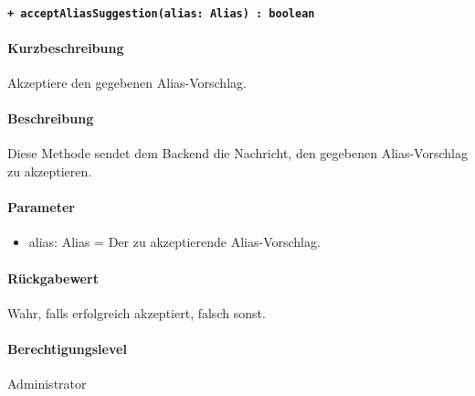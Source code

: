 \paragraph{\texttt{+ acceptAliasSuggestion(alias: Alias) : boolean}}\label{AP_Framework_acceptAliasSuggestion}%
\paragraph*{Kurzbeschreibung}
Akzeptiere den gegebenen Alias-Vorschlag.
\paragraph*{Beschreibung}
Diese Methode sendet dem Backend die Nachricht, den gegebenen Alias-Vorschlag zu akzeptieren.
\paragraph*{Parameter}
\begin{itemize}
    \item alias: Alias = Der zu akzeptierende Alias-Vorschlag.
\end{itemize}
\paragraph*{Rückgabewert}
Wahr, falls erfolgreich akzeptiert, falsch sonst.
\paragraph*{Berechtigungslevel}
Administrator